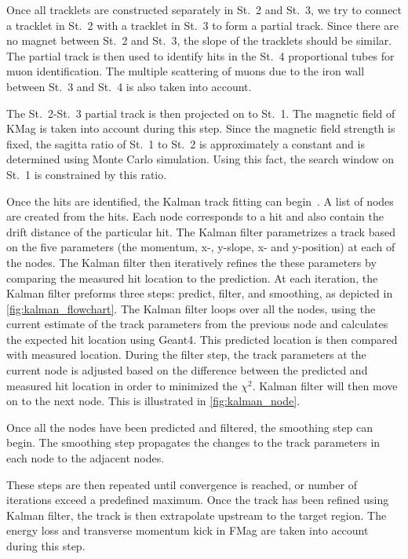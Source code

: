 \documentclass[../main.tex]{subfiles}
\begin{document}
Once all tracklets are constructed separately in St.~2 and St.~3, we try to connect a tracklet
in St.~2 with a tracklet in St.~3 to form a partial track. Since there are no magnet between
St.~2 and St.~3, the slope of the tracklets should be similar. The partial track is then used to
identify hits in the St.~4 proportional tubes for muon identification. The multiple scattering of
muons due to the iron wall between St.~3 and St.~4 is also taken into account.

The St.~2-St.~3 partial track is then projected on to St.~1. The magnetic field of KMag is taken into
account during this step. Since the magnetic field strength is fixed, the sagitta ratio of St.~1 to
St.~2 is approximately a constant and is determined using Monte Carlo simulation. Using this fact,
the search window on St.~1 is constrained by this ratio.

Once the hits are identified, the Kalman track fitting can begin~\cite{kalman1960}. A list of nodes are created
from the hits. Each node corresponds to a hit and also contain the drift distance of the particular hit.
The Kalman filter parametrizes a track based on the five parameters (the momentum, x-, y-slope, x- and y-position)
at each of the nodes.
The Kalman filter then iteratively refines the these parameters by comparing the measured hit location
to the prediction. At each iteration, the Kalman filter preforms three steps: predict, filter, and smoothing,
as depicted in \cref{fig:kalman_flowchart}.
The Kalman filter loops over all the nodes, using the current estimate of the track parameters
from the previous node and calculates the expected hit location using Geant4. This predicted location
is then compared with measured location. During the filter step, the track parameters at the current node is
adjusted based on the difference between the predicted and measured hit location in order to minimized
the $\chi^2$. Kalman filter will then move on to the next node. This is illustrated in \cref{fig:kalman_node}.

Once all the nodes have been predicted and filtered, the smoothing step can begin. The smoothing step propagates
the changes to the track parameters in each node to the adjacent nodes.

These steps are then repeated until convergence is reached, or number of iterations exceed a predefined
maximum.
Once the track has been refined using Kalman filter, the track is then extrapolate upstream to the target
region. The energy loss and transverse momentum kick in FMag are taken into account during this step.
\end{document}
